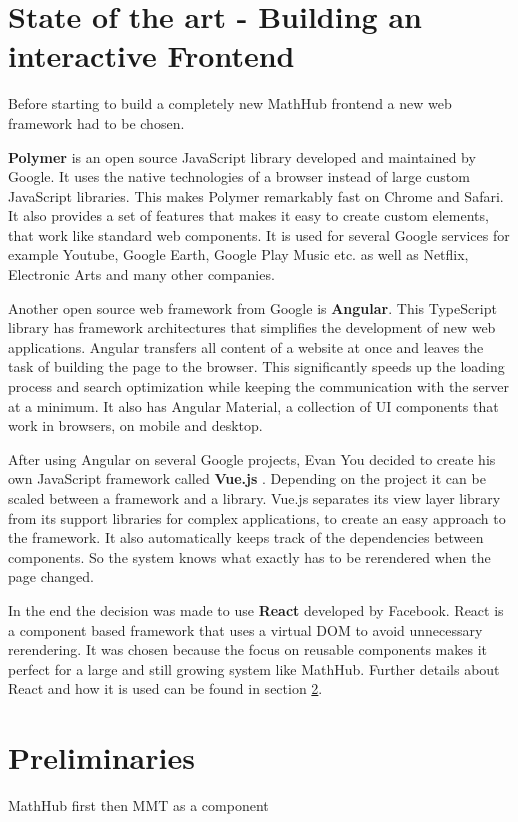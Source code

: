 \documentclass[11pt,a4paper]{article}
\begin{document}
\section{State of the art - Building an interactive Frontend} \label{SoA}
Before starting to build a completely new MathHub frontend a new web framework had to be chosen.

\textbf{Polymer} \cite{polymer} is an open source JavaScript library developed and maintained by Google.
It uses the native technologies of a browser instead of large custom JavaScript libraries.
This makes Polymer remarkably fast on Chrome and Safari.
It also provides a set of features that makes it easy to create custom elements, that work like standard web components.
It is used for several Google services for example Youtube, Google Earth, Google Play Music etc. as well as Netflix, Electronic Arts and many other companies. 

Another open source web framework from Google is \textbf{Angular}\cite{angular}.
This TypeScript library has framework architectures that simplifies the development of new web applications.
Angular transfers all content of a website at once and leaves the task of building the page to the browser.
This significantly speeds up the loading process and search optimization while keeping the communication with the server at a minimum. 
It also has Angular Material, a collection of UI components that work in browsers, on mobile and desktop.

After using Angular on several Google projects, Evan You decided to create his own JavaScript framework called \textbf{Vue.js} \cite{vuewiki}.
Depending on the project it can be scaled between a framework and a library.
Vue.js separates its view layer library from its support libraries for complex applications, to create an easy approach to the framework.
It also automatically keeps track of the dependencies between components.
So the system knows what exactly has to be rerendered when the page changed\cite{vuegit}.

In the end the decision was made to use \textbf{React} developed by Facebook.
React is a component based framework that uses a virtual DOM to avoid unnecessary rerendering.
It was chosen because the focus on reusable components makes it perfect for a large and still growing system like MathHub.
Further details about React and how it is used can be found in section \ref{preliminaries}.


\section{Preliminaries} \label{preliminaries}
MathHub first then MMT as a component
\end{document}
